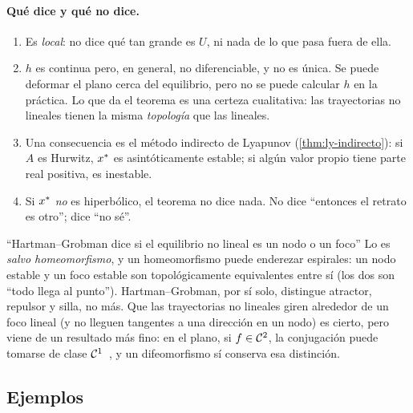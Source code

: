 \paragraph{Qué dice y qué no dice.}
\begin{enumerate}
  \item Es \emph{local}: no dice qué tan grande es $U$, ni nada de lo que pasa fuera de ella.
  \item $h$ es continua pero, en general, no diferenciable, y no es única. Se puede deformar el plano cerca del equilibrio, pero no se puede calcular $h$ en la práctica. Lo que da el teorema es una certeza cualitativa: las trayectorias no lineales tienen la misma \emph{topología} que las lineales.
  \item Una consecuencia es el método indirecto de Lyapunov (\cref{thm:ly-indirecto}): si $A$ es Hurwitz, $x^{*}$ es asintóticamente estable; si algún valor propio tiene parte real positiva, es inestable.
  \item Si $x^{*}$ \emph{no} es hiperbólico, el teorema no dice nada. No dice ``entonces el retrato es otro''; dice ``no sé''.
\end{enumerate}

\begin{trampa}[label=tr:bi-hgfoco]{``Hartman--Grobman dice si el equilibrio no lineal es un nodo o un foco''}
Lo es \emph{salvo homeomorfismo}, y un homeomorfismo puede enderezar espirales: un nodo estable y un foco estable son topológicamente equivalentes entre sí (los dos son ``todo llega al punto''). Hartman--Grobman, por sí solo, distingue atractor, repulsor y silla, no más. Que las trayectorias no lineales giren alrededor de un foco lineal (y no lleguen tangentes a una dirección en un nodo) es cierto, pero viene de un resultado más fino: en el plano, si $f\in\mathcal{C}^{2}$, la conjugación puede tomarse de clase $\mathcal{C}^{1}$~\citep{Har60b}, y un difeomorfismo sí conserva esa distinción.
\end{trampa}

\subsection{Ejemplos}

